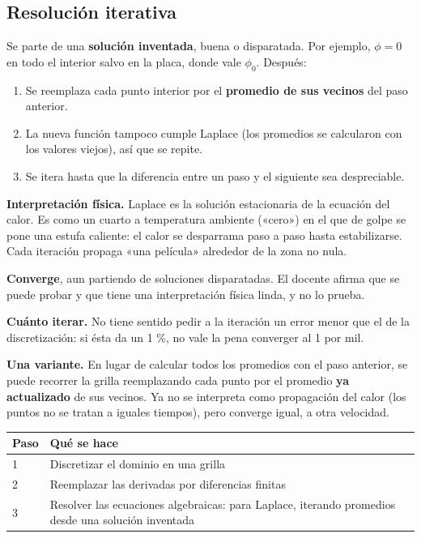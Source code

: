 \documentclass[12pt,a4paper]{article}
\begin{document}
\subsection{Resolución iterativa}

Se parte de una \textbf{solución inventada}, buena o disparatada. Por ejemplo,
$\phi = 0$ en todo el interior salvo en la placa, donde vale $\phi_0$. Después:

\begin{enumerate}
  \item Se reemplaza cada punto interior por el \textbf{promedio de sus vecinos} del paso
  anterior.
  \item La nueva función tampoco cumple Laplace (los promedios se calcularon con los
  valores viejos), así que se repite.
  \item Se itera hasta que la diferencia entre un paso y el siguiente sea
  despreciable.
\end{enumerate}

\textbf{Interpretación física.} Laplace es la solución estacionaria de la ecuación
del calor. Es como un cuarto a temperatura ambiente («cero») en el que de golpe
se pone una estufa caliente: el calor se desparrama paso a paso hasta
estabilizarse. Cada iteración propaga «una película» alrededor de la zona no
nula.

\begin{notebox}
\textbf{Converge}, aun partiendo de soluciones disparatadas. El docente afirma que
se puede probar y que tiene una interpretación física linda, y no lo prueba.
\end{notebox}

\textbf{Cuánto iterar.} No tiene sentido pedir a la iteración un error menor que el
de la discretización: si ésta da un 1 \%, no vale la pena converger al 1 por
mil.

\textbf{Una variante.} En lugar de calcular todos los promedios con el paso
anterior, se puede recorrer la grilla reemplazando cada punto por el promedio
\textbf{ya actualizado} de sus vecinos. Ya no se interpreta como propagación del
calor (los puntos no se tratan a iguales tiempos), pero converge igual, a otra
velocidad.

\begin{center}
\renewcommand{\arraystretch}{1.35}
\small
\begin{tabularx}{\textwidth}{l>{\raggedright\arraybackslash}X}
\toprule
\textbf{Paso} & \textbf{Qué se hace} \\
\midrule
1 & Discretizar el dominio en una grilla \\
2 & Reemplazar las derivadas por diferencias finitas \\
3 & Resolver las ecuaciones algebraicas: para Laplace, iterando promedios desde una solución inventada \\
\bottomrule
\end{tabularx}
\end{center}
\end{document}
